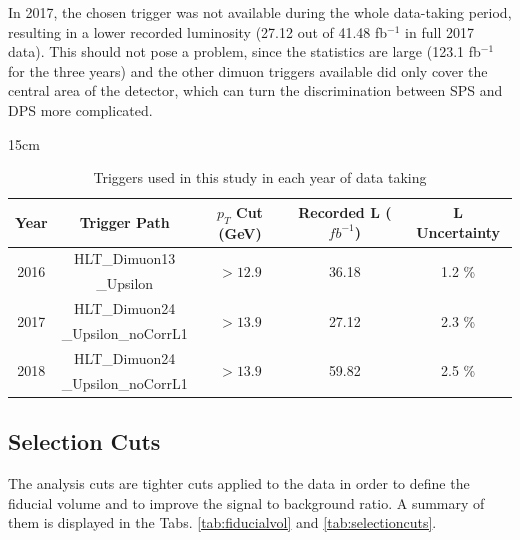 In 2017, the chosen trigger was not available during the whole data-taking period, resulting in a lower recorded luminosity (27.12 out of 41.48 fb$^{-1}$ in full 2017 data). This should not pose a problem, since the statistics are large (123.1 fb$^{-1}$ for the three years) and the other dimuon triggers available did only cover the central area of the detector, which can turn the discrimination between SPS and DPS more complicated.

\begin{table}[!htbp]{15cm}
  \caption{Triggers used in this study in each year of data taking}
  \begin{tabular}{ c | c | c | c | c }
    Year                     & Trigger Path        & $p_T$ Cut (GeV)             & Recorded L ($fb^{-1}$)    & L Uncertainty              \\  \hline
    \multirow[c]{2}{*}{2016} & HLT\_Dimuon13       & \multirow[c]{2}{*}{$>12.9$} & \multirow[c]{2}{*}{36.18} & \multirow[c]{2}{*}{1.2 \%} \\
                             & \_Upsilon           &                             &                                                        \\ \hline
    \multirow[c]{2}{*}{2017} & HLT\_Dimuon24       & \multirow[c]{2}{*}{$>13.9$} & \multirow[c]{2}{*}{27.12} & \multirow[c]{2}{*}{2.3 \%} \\
                             & \_Upsilon\_noCorrL1 &                             &                           &                            \\ \hline
    \multirow[c]{2}{*}{2018} & HLT\_Dimuon24       & \multirow[c]{2}{*}{$>13.9$} & \multirow[c]{2}{*}{59.82} & \multirow[c]{2}{*}{2.5 \%} \\
                             & \_Upsilon\_noCorrL1 &                             &                           &                            \\ \hline
  \end{tabular}
  \label{tab:triggers}
\end{table}

\subsection{Selection Cuts} \label{sec:selcuts}

The analysis cuts are tighter cuts applied to the data in order to define the fiducial volume and to improve the signal to background ratio. A summary of them is displayed in the Tabs. \ref{tab:fiducialvol} and \ref{tab:selectioncuts}.

